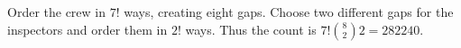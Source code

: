 Order the crew in $7!$ ways, creating eight gaps. Choose two different gaps for the inspectors and order them in $2!$ ways. Thus the count is $\boxed{7!\binom82 2=282240}$.
